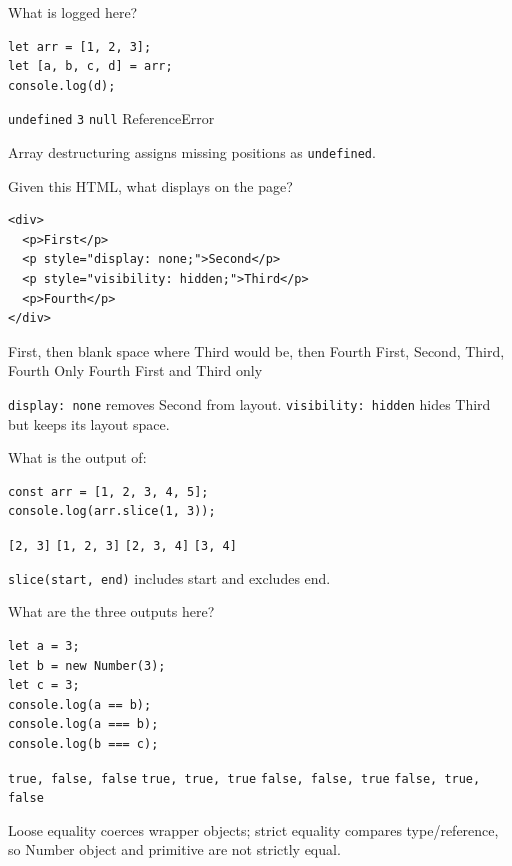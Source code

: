 \question[4]
What is logged here?
\begin{lstlisting}[style=js]
let arr = [1, 2, 3];
let [a, b, c, d] = arr;
console.log(d);
\end{lstlisting}
\begin{choices}
  \CorrectChoice \texttt{undefined}
  \choice \texttt{3}
  \choice \texttt{null}
  \choice ReferenceError
\end{choices}
\begin{solution}
  Array destructuring assigns missing positions as \texttt{undefined}.
\end{solution}

\question[4]
Given this HTML, what displays on the page?
\begin{lstlisting}[style=htmlinline]
<div>
  <p>First</p>
  <p style="display: none;">Second</p>
  <p style="visibility: hidden;">Third</p>
  <p>Fourth</p>
</div>
\end{lstlisting}
\begin{choices}
  \CorrectChoice First, then blank space where Third would be, then Fourth
  \choice First, Second, Third, Fourth
  \choice Only Fourth
  \choice First and Third only
\end{choices}
\begin{solution}
  \texttt{display: none} removes Second from layout. \texttt{visibility: hidden} hides Third but keeps its layout space.
\end{solution}

\question[4]
What is the output of:
\begin{lstlisting}[style=js]
const arr = [1, 2, 3, 4, 5];
console.log(arr.slice(1, 3));
\end{lstlisting}
\begin{choices}
  \CorrectChoice \texttt{[2, 3]}
  \choice \texttt{[1, 2, 3]}
  \choice \texttt{[2, 3, 4]}
  \choice \texttt{[3, 4]}
\end{choices}
\begin{solution}
  \texttt{slice(start, end)} includes start and excludes end.
\end{solution}

\question[4]
What are the three outputs here?
\begin{lstlisting}[style=js]
let a = 3;
let b = new Number(3);
let c = 3;
console.log(a == b);
console.log(a === b);
console.log(b === c);
\end{lstlisting}
\begin{choices}
  \CorrectChoice \texttt{true, false, false}
  \choice \texttt{true, true, true}
  \choice \texttt{false, false, true}
  \choice \texttt{false, true, false}
\end{choices}
\begin{solution}
  Loose equality coerces wrapper objects; strict equality compares type/reference, so Number object and primitive are not strictly equal.
\end{solution}

